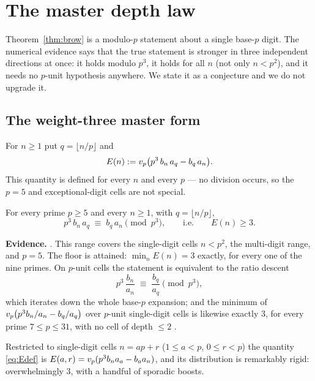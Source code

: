 \section{The master depth law}
\label{sec:depth}

Theorem~\ref{thm:brow} is a modulo-$p$ statement about a single base-$p$ digit. The
numerical evidence says that the true statement is stronger in three independent
directions at once: it holds modulo $p^3$, it holds for all $n$ (not only $n<p^2$), and
it needs no $p$-unit hypothesis anywhere. We state it as a conjecture and we do not
upgrade it.

\subsection{The weight-three master form}

For $n\ge1$ put $q=\lfloor n/p\rfloor$ and
\begin{equation}\label{eq:Edef}
   E(n):=v_p\bigl(p^3\,b_n\,a_q-b_q\,a_n\bigr).
\end{equation}
This quantity is defined for every $n$ and every $p$ --- no division occurs, so the
$p=5$ and exceptional-digit cells are not special.

\begin{conjecture}\label{conj:master3}
For every prime $p\ge5$ and every $n\ge1$, with $q=\lfloor n/p\rfloor$,
\[
   p^3\,b_n\,a_q\;\equiv\;b_q\,a_n \pmod{p^3},
   \qquad\text{i.e.}\qquad E(n)\ge3 .
\]
\end{conjecture}

\noindent\textbf{Evidence.} . This range covers the single-digit cells
$n<p^2$, the multi-digit range, and $p=5$. The floor is attained: $\min_nE(n)=3$ exactly,
for every one of the nine primes. On $p$-unit cells the statement is equivalent to the
ratio descent
\[
   p^3\,\frac{b_n}{a_n}\;\equiv\;\frac{b_q}{a_q}\pmod{p^3},
\]
which iterates down the whole base-$p$ expansion; and the minimum of
$v_p\bigl(p^3b_n/a_n-b_q/a_q\bigr)$ over $p$-unit single-digit cells is likewise exactly
$3$, for every prime $7\le p\le31$, with no cell of depth $\le2$
.

Restricted to single-digit cells $n=ap+r$ ($1\le a<p$, $0\le r<p$) the quantity
\eqref{eq:Edef} is $E(a,r)=v_p(p^3b_na_a-b_aa_n)$, and its distribution is remarkably
rigid: overwhelmingly $3$, with a handful of sporadic boosts.

